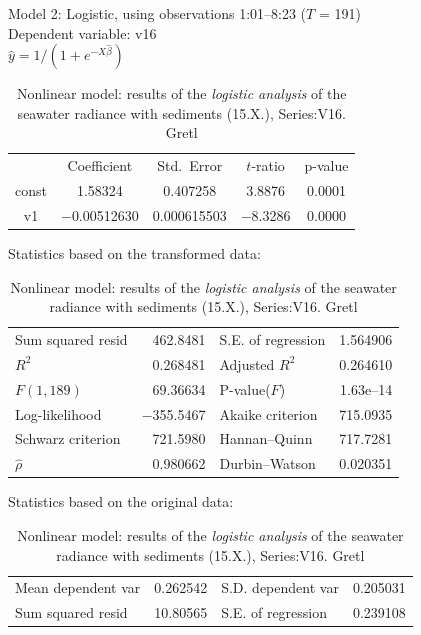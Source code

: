 \documentclass[10pt, a4paper]{article}
\begin{document}
\begin{appendices}
\begin{table}
\caption{Nonlinear model: results of the \textit{logistic analysis} of the seawater radiance with sediments (15.X.), Series:V16. Gretl}
\begin{center}
Model 2: Logistic, using observations 1:01--8:23 ($T$ = 191)\\
Dependent variable: v16\\
$\hat{y} = 1 / (1 + e^{-X\hat{\beta}})$

\vspace{1em}

\begin{tabular}{|c|c|c|c|c|}
  & {Coefficient} & {Std.\ Error} & {$t$-ratio} & {p-value} \\[1ex]
const &  1.58324 &     0.407258 &       3.8876 &         0.0001 \\
v1 &   $-$0.00512630 &     0.000615503 &       $-$8.3286 &         0.0000 \\
\end{tabular}

\vspace{1em}Statistics based on the transformed data:

\vspace{1ex}
\begin{tabular}{lrlr}
Sum squared resid &  462.8481 & S.E. of regression &  1.564906 \\
$R^2$ &  0.268481 & Adjusted $R^2$ &  0.264610 \\
$F(1, 189)$ &  69.36634 & P-value($F$) &  1.63\textrm{e--14} \\
Log-likelihood & $-$355.5467 & Akaike criterion &  715.0935 \\
Schwarz criterion &  721.5980 & Hannan--Quinn &  717.7281 \\
$\hat{\rho}$ &  0.980662 & Durbin--Watson &  0.020351 \\
\end{tabular}

\vspace{1em}Statistics based on the original data:

\vspace{1ex}
\begin{tabular}{lrlr}
Mean dependent var &  0.262542 & S.D. dependent var &  0.205031 \\
Sum squared resid &  10.80565 & S.E. of regression &  0.239108 \\
\end{tabular}
\end{center}
\end{table}


\end{appendices}
\end{document}

